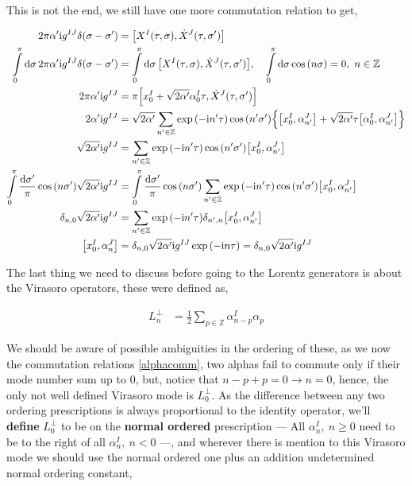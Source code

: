 This is not the end, we still have one more commutation relation to get,

\begin{align*}
    2\pi\alpha'\im g^{IJ}\delta\qty(\sigma-\sigma')&=\comm{X^I\qty(\tau,\sigma)}{{\dot X}^J\qty(\tau,\sigma')}\\
    \int\limits_0^\pi\dd{\sigma}2\pi\alpha'\im g^{IJ}\delta\qty(\sigma-\sigma')&=\int\limits_0^\pi\dd{\sigma}\comm{X^I\qty(\tau,\sigma)}{{\dot X}^J\qty(\tau,\sigma')},\ \ \ \int\limits_0^\pi\dd{\sigma}\cos\qty(n\sigma)=0,\ n\in\mathbb Z\\
    2\pi\alpha'\im g^{IJ}&=\pi\comm{x_0^I+\sqrt{2\alpha'}\alpha_0^I\tau}{{\dot X}^J\qty(\tau,\sigma')}\\
    2\alpha'\im g^{IJ}&=\sqrt{2\alpha'}\sum\limits_{n'\in\mathbb Z}\exp\qty(-\im n'\tau)\cos\qty(n'\sigma')\qty{\comm{x_0^I}{\alpha_{n'}^J}+\sqrt{2\alpha'}\tau\comm{\alpha_0^I}{\alpha_{n'}^J}}\\
    \sqrt{2\alpha'}\im g^{IJ}&=\sum\limits_{n'\in\mathbb Z}\exp\qty(-\im n'\tau)\cos\qty(n'\sigma')\comm{x_0^I}{\alpha_{n'}^J}\\
    \int\limits_0^\pi\frac{\dd{\sigma'}}{\pi}\cos\qty(n\sigma')\sqrt{2\alpha'}\im g^{IJ}&=\int\limits_0^\pi\frac{\dd{\sigma'}}{\pi}\cos\qty(n\sigma')\sum\limits_{n'\in\mathbb Z}\exp\qty(-\im n'\tau)\cos\qty(n'\sigma')\comm{x_0^I}{\alpha_{n'}^J}\\
    \delta_{n,0}\sqrt{2\alpha'}\im g^{IJ}&=\sum\limits_{n'\in\mathbb Z}\exp\qty(-\im n'\tau)\delta_{n',n}\comm{x_0^I}{\alpha_{n'}^J}\\
    \comm{x_0^I}{\alpha_{n}^J}&=\delta_{n,0}\sqrt{2\alpha'}\im g^{IJ}\exp\qty(-\im n\tau)=\delta_{n,0}\sqrt{2\alpha'}\im g^{IJ}
\end{align*}

The last thing we need to discuss before going to the Lorentz generators is about the Virasoro operators, these were defined as,

\begin{align*}
    L^\perp_n&=\frac12\sum\limits_{p\in\mathbb Z}\alpha_{n-p}^I\alpha_{p}
\end{align*}

We should be aware of possible ambiguities in the ordering of these, as we now the commutation relations \ref{alphacomm}, two alphas fail 
to commute only if their mode number sum up to $0$, but, notice that $n-p+p=0\rightarrow n=0$, hence, the only not well defined Virasoro mode is 
$L^\perp_0$. As the difference between any two ordering prescriptions is always proportional to the identity operator, we'll \textbf{define} $L^\perp_0$ 
to be on the \textbf{normal ordered} prescription --- All $\alpha_n^I,\ n\geq 0$ need to be to the right of all $\alpha_n^I,\ n<0$ ---, and wherever there is 
mention to this Virasoro mode we should use the normal ordered one plus an addition undetermined normal ordering constant,

